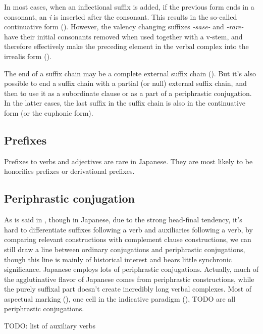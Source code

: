 \documentclass[UTF8, a4paper, oneside, scheme=plain]{ctexrep}
\newcommand{\corpus}[1]{\emph{#1}}
\begin{document}
In most cases,
when an inflectional suffix is added,
if the previous form ends in a consonant,
an \corpus{i} is inserted after the consonant.
This results in the so-called continuative form ().
However, the valency changing suffixes \corpus{-sase-} and \corpus{-rare-}
have their initial consonants removed when used together with a v-stem,
and therefore effectively make the preceding element in the verbal complex into the irrealis form 
().

The end of a suffix chain may be a complete external suffix chain 
().
But it's also possible to end a suffix chain with a partial (or null) external suffix chain,
and then to use it as a subordinate clause or as a part of a periphrastic conjugation.
In the latter cases, 
the last suffix in the suffix chain is also in the continuative form
(or the euphonic form).

\subsection{Prefixes}\label{sec:prefixes}

Prefixes to verbs and adjectives are rare in Japanese.
They are most likely to be honorifics prefixes or derivational prefixes.

\subsection{Periphrastic conjugation}\label{sec:periphrastic}

As is said in ,
though in Japanese, 
due to the strong head-final tendency,
it's hard to differentiate
suffixes following a verb and auxiliaries following a verb,
by comparing relevant constructions with complement clause constructions, 
we can still draw a line between ordinary conjugations and periphrastic conjugations,
though this line is mainly of historical interest and bears little synchronic significance.
Japanese employs lots of periphrastic conjugations.
Actually, much of the agglutinative flavor of Japanese comes from periphrastic constructions,
while the purely suffixal part doesn't create incredibly long verbal complexes.
Most of aspectual marking (), 
one cell in the indicative paradigm (), TODO 
are all periphrastic conjugations.

TODO: list of auxiliary verbs
\end{document}
